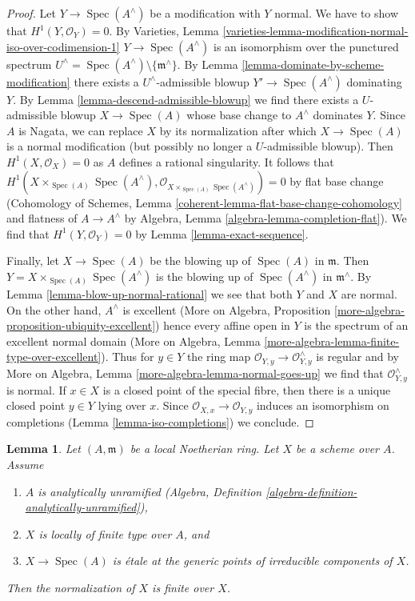 \documentclass{stacks-project}
\theoremstyle{plain}
\newtheorem{lemma}[subsection]{Lemma}
\theoremstyle{definition}
\theoremstyle{remark}
\numberwithin{equation}{subsection}
\def\Spec{\mathop{\mathrm{Spec}}}
\begin{document}
\begin{proof}
Let $Y \to \Spec(A^\wedge)$ be a modification with $Y$ normal.
We have to show that $H^1(Y, \mathcal{O}_Y) = 0$. By Varieties, Lemma
\ref{varieties-lemma-modification-normal-iso-over-codimension-1}
$Y \to \Spec(A^\wedge)$ is an isomorphism over the punctured
spectrum $U^\wedge = \Spec(A^\wedge) \setminus \{\mathfrak m^\wedge\}$.
By Lemma \ref{lemma-dominate-by-scheme-modification}
there exists a $U^\wedge$-admissible blowup $Y' \to \Spec(A^\wedge)$
dominating $Y$. By Lemma \ref{lemma-descend-admissible-blowup}
we find there exists a $U$-admissible blowup $X \to \Spec(A)$
whose base change to $A^\wedge$ dominates $Y$.
Since $A$ is Nagata, we can replace $X$ by its normalization
after which $X \to \Spec(A)$ is a normal modification (but
possibly no longer a $U$-admissible blowup).
Then $H^1(X, \mathcal{O}_X) = 0$ as $A$ defines a rational
singularity. It follows that
$H^1(X \times_{\Spec(A)} \Spec(A^\wedge),
\mathcal{O}_{X \times_{\Spec(A)} \Spec(A^\wedge)}) = 0$
by flat base change (Cohomology of Schemes, Lemma
\ref{coherent-lemma-flat-base-change-cohomology}
and flatness of $A \to A^\wedge$ by
Algebra, Lemma \ref{algebra-lemma-completion-flat}).
We find that $H^1(Y, \mathcal{O}_Y) = 0$ by
Lemma \ref{lemma-exact-sequence}.

\medskip\noindent
Finally, let $X \to \Spec(A)$ be the blowing up of $\Spec(A)$
in $\mathfrak m$. Then $Y = X \times_{\Spec(A)} \Spec(A^\wedge)$
is the blowing up of $\Spec(A^\wedge)$ in $\mathfrak m^\wedge$.
By Lemma \ref{lemma-blow-up-normal-rational} we see that both $Y$
and $X$ are normal. On the other hand, $A^\wedge$ is excellent
(More on Algebra, Proposition
\ref{more-algebra-proposition-ubiquity-excellent})
hence every affine open in $Y$ is the spectrum of an
excellent normal domain
(More on Algebra, Lemma \ref{more-algebra-lemma-finite-type-over-excellent}).
Thus for $y \in Y$ the ring map
$\mathcal{O}_{Y, y} \to \mathcal{O}_{Y, y}^\wedge$
is regular and by
More on Algebra, Lemma \ref{more-algebra-lemma-normal-goes-up}
we find that $\mathcal{O}_{Y, y}^\wedge$ is normal.
If $x \in X$ is a closed point of the special fibre,
then there is a unique closed point $y \in Y$ lying over $x$.
Since $\mathcal{O}_{X, x} \to \mathcal{O}_{Y, y}$ induces
an isomorphism on completions (Lemma \ref{lemma-iso-completions})
we conclude.
\end{proof}

\begin{lemma}
\label{lemma-formally-unramified}
Let $(A, \mathfrak m)$ be a local Noetherian ring. Let
$X$ be a scheme over $A$. Assume
\begin{enumerate}
\item $A$ is analytically unramified
(Algebra, Definition \ref{algebra-definition-analytically-unramified}),
\item $X$ is locally of finite type over $A$, and
\item $X \to \Spec(A)$ is \'etale at the generic points of irreducible
components of $X$.
\end{enumerate}
Then the normalization of $X$ is finite over $X$.
\end{lemma}
\end{document}
